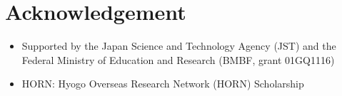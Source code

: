 \documentclass{frontiersSCNS} %
\begin{document}


\section*{Acknowledgement}
\begin{itemize}
\item Supported by the Japan Science and Technology Agency (JST) and the
      Federal Ministry of Education and Research (BMBF, grant 01GQ1116)
\item HORN: Hyogo Overseas Research Network (HORN) Scholarship
\end{itemize}





\end{document}
